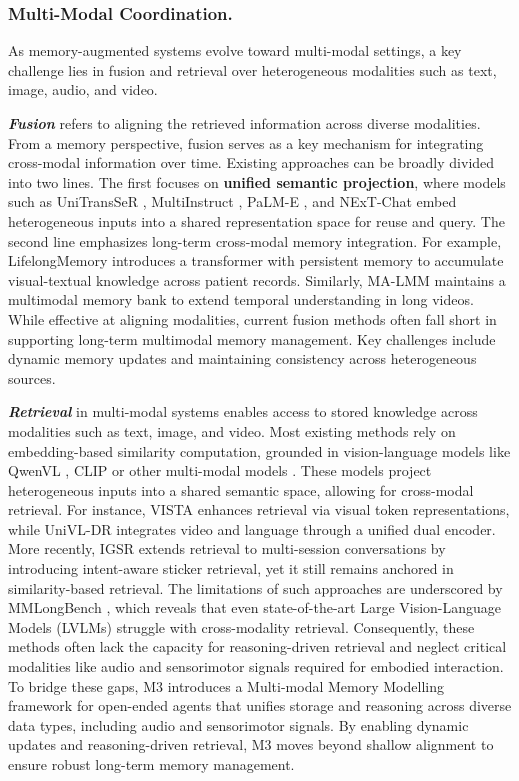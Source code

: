 \documentclass[manuscript,screen]{acmart}
\begin{document}
\subsubsection{Multi-Modal Coordination.}
As memory-augmented systems evolve toward multi-modal settings, a key challenge lies in fusion and retrieval over heterogeneous modalities such as text, image, audio, and video.

\textit{\textbf{Fusion}} refers to aligning the retrieved information across diverse modalities. From a memory perspective, fusion serves as a key mechanism for integrating cross-modal information over time. Existing approaches can be broadly divided into two lines. The first focuses on \textbf{unified semantic projection}, where models such as UniTransSeR \citep{ma-etal-2022-unitranser}, MultiInstruct \citep{xu-etal-2023-multiinstruct}, PaLM-E \citep{driess2023palme}, and NExT-Chat \citep{zhang2023nextchat} embed heterogeneous inputs into a shared representation space for reuse and query.
The second line emphasizes long-term cross-modal memory integration. For example, LifelongMemory \citep{wang2023lifelongmemory} introduces a transformer with persistent memory to accumulate visual-textual knowledge across patient records. Similarly, MA-LMM \citep{he2024ma} maintains a multimodal memory bank to extend temporal understanding in long videos. While effective at aligning modalities, current fusion methods often fall short in supporting long-term multimodal memory management. Key challenges include dynamic memory updates and maintaining consistency across heterogeneous sources.

\textit{\textbf{Retrieval}} in multi-modal systems enables access to stored knowledge across modalities such as text, image, and video. Most existing methods rely on embedding-based similarity computation, grounded in vision-language models like QwenVL \citep{bai2023qwenvl}, CLIP \citep{pmlr-v139-radford21a} or other multi-modal models \citep{li-etal-2024-generative}. These models project heterogeneous inputs into a shared semantic space, allowing for cross-modal retrieval. For instance, VISTA \citep{zhou2024vista} enhances retrieval via visual token representations, while UniVL-DR \citep{liu2023univldr} integrates video and language through a unified dual encoder. More recently, IGSR \citep{wang2025new} extends retrieval to multi-session conversations by introducing intent-aware sticker retrieval, yet it still remains anchored in similarity-based retrieval. The limitations of such approaches are underscored by MMLongBench \citep{wang2025mmlongbench}, which reveals that even state-of-the-art Large Vision-Language Models (LVLMs) struggle with cross-modality retrieval. Consequently, these methods often lack the capacity for reasoning-driven retrieval and neglect critical modalities like audio and sensorimotor signals required for embodied interaction. To bridge these gaps, M3 \citep{long2025seeinglisteningrememberingreasoning} introduces a Multi-modal Memory Modelling framework for open-ended agents that unifies storage and reasoning across diverse data types, including audio and sensorimotor signals. By enabling dynamic updates and reasoning-driven retrieval, M3 moves beyond shallow alignment to ensure robust long-term memory management.
\end{document}
